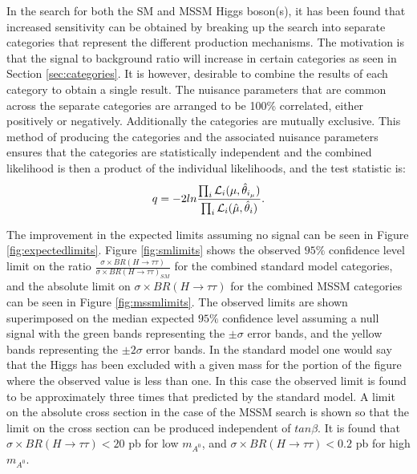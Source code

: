 In the search for both the SM and MSSM Higgs boson(s), it has been found that increased sensitivity can be obtained by breaking up the search into separate categories that represent the different production mechanisms.
The motivation is that the signal to background ratio will increase in certain categories as seen in Section \ref{sec:categories}.
It is however, desirable to combine the results of each category to obtain a single result.
The nuisance parameters that are common across the separate categories are arranged to be 100\% correlated, either positively or negatively. 
Additionally the categories are mutually exclusive.
This method of producing the categories and the associated nuisance parameters ensures that the categories are statistically independent and the combined likelihood is then a product of the individual likelihoods, and the test statistic is:
\begin{equation}
q = -2ln\frac{\prod_{i}\mathcal{L}_{i}(\mu, \hat{\theta}_{i_{\mu}})}{\prod_{i}\mathcal{L}_{i}(\hat{\mu}, \hat{\theta}_{i})}.
\end{equation}

The improvement in the expected limits assuming no signal can be seen in Figure \ref{fig:expectedlimits}.
Figure \ref{fig:smlimits} shows the observed $95\%$ confidence level limit on the ratio $\frac{\sigma\times BR(H\rightarrow\tau\tau)}{\sigma\times BR(H\rightarrow\tau\tau)_{SM}}$ for the combined standard model categories, and the absolute limit on $\sigma\times BR(H\rightarrow\tau\tau)$ for the combined MSSM categories can be seen in Figure \ref{fig:mssmlimits}.
The observed limits are shown superimposed on the median expected $95\%$ confidence level assuming a null signal with the green bands representing the $\pm\sigma$ error bands, and the yellow bands representing the $\pm 2\sigma$ error bands.
In the standard model one would say that the Higgs has been excluded with a given mass for the portion of the figure where the observed value is less than one. 
In this case the observed limit is found to be approximately three times that predicted by the standard model.
A limit on the absolute cross section in the case of the MSSM search is shown so that the limit on the cross section can be produced independent of $tan\beta$. 
It is found that $\sigma\times BR(H\rightarrow\tau\tau) < 20$ pb for low $m_{A^{0}}$, and $\sigma\times BR(H\rightarrow\tau\tau) < 0.2$ pb for high $m_{A^{0}}$.

